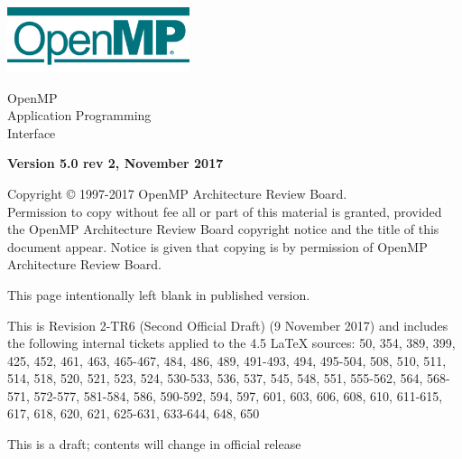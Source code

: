 
  \begin{titlepage}
    \begin{flushleft}
     \hspace{-6em} \includegraphics[width=0.4\textwidth]{openmp-logo.png}
    \end{flushleft}

    \begin{adjustwidth}{-0.75in}{0in}
    \begin{center}
      \Huge
      \textsf{OpenMP\\Application Programming\\Interface}

      \vspace{0.5in}\textsf{    }\vspace{-0.7in}
      \normalsize

      \vspace{1.0in}

      \textbf{Version 5.0 rev 2, November 2017}
    \end{center}
    \end{adjustwidth}

    \vspace{3.0in}

\begin{adjustwidth}{0pt}{1em}\setlength{\parskip}{0.25\baselineskip}%
Copyright © 1997-2017 OpenMP Architecture Review Board.\\
Permission to copy without fee all or part of this material is granted,
provided the OpenMP Architecture Review Board copyright notice and
the title of this document appear. Notice is given that copying is by
permission of OpenMP Architecture Review Board.\end{adjustwidth}

  \end{titlepage}


\clearpage
\thispagestyle{empty}
\phantom{a}
This page intentionally left blank in published version.

This is Revision 2-TR6 (Second Official Draft) (9 November 2017) and 
includes the following internal tickets applied to the 4.5 LaTeX sources: 
50, 354, 389, 399, 425, 452, 461, 463, 465-467, 484, 486, 489, 491-493, 494, 
495-504, 508, 510, 511, 514, 518, 520, 521, 523, 524, 530-533, 536, 537, 
545, 548, 551, 555-562, 564, 568-571, 572-577, 581-584, 586, 590-592, 594, 
597, 601, 603, 606, 608, 610, 611-615, 617, 618, 620, 621, 625-631, 633-644, 
648, 650

This is a draft; contents will change in official release

\vfill

